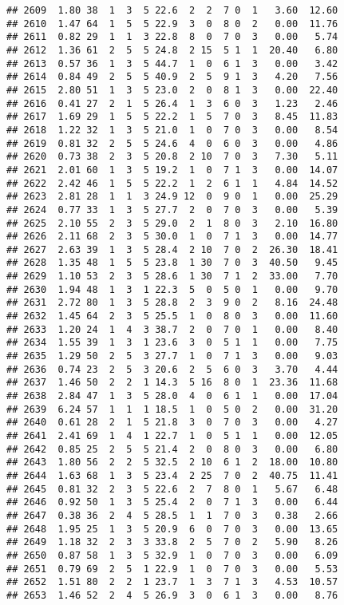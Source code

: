 \documentclass[
]{article}
\begin{document}
\begin{verbatim}
## 2609  1.80 38  1  3  5 22.6  2  2  7 0  1   3.60  12.60
## 2610  1.47 64  1  5  5 22.9  3  0  8 0  2   0.00  11.76
## 2611  0.82 29  1  1  3 22.8  8  0  7 0  3   0.00   5.74
## 2612  1.36 61  2  5  5 24.8  2 15  5 1  1  20.40   6.80
## 2613  0.57 36  1  3  5 44.7  1  0  6 1  3   0.00   3.42
## 2614  0.84 49  2  5  5 40.9  2  5  9 1  3   4.20   7.56
## 2615  2.80 51  1  3  5 23.0  2  0  8 1  3   0.00  22.40
## 2616  0.41 27  2  1  5 26.4  1  3  6 0  3   1.23   2.46
## 2617  1.69 29  1  5  5 22.2  1  5  7 0  3   8.45  11.83
## 2618  1.22 32  1  3  5 21.0  1  0  7 0  3   0.00   8.54
## 2619  0.81 32  2  5  5 24.6  4  0  6 0  3   0.00   4.86
## 2620  0.73 38  2  3  5 20.8  2 10  7 0  3   7.30   5.11
## 2621  2.01 60  1  3  5 19.2  1  0  7 1  3   0.00  14.07
## 2622  2.42 46  1  5  5 22.2  1  2  6 1  1   4.84  14.52
## 2623  2.81 28  1  1  3 24.9 12  0  9 0  1   0.00  25.29
## 2624  0.77 33  1  3  5 27.7  2  0  7 0  3   0.00   5.39
## 2625  2.10 55  2  3  5 29.0  2  1  8 0  3   2.10  16.80
## 2626  2.11 68  2  3  5 30.0  1  0  7 1  3   0.00  14.77
## 2627  2.63 39  1  3  5 28.4  2 10  7 0  2  26.30  18.41
## 2628  1.35 48  1  5  5 23.8  1 30  7 0  3  40.50   9.45
## 2629  1.10 53  2  3  5 28.6  1 30  7 1  2  33.00   7.70
## 2630  1.94 48  1  3  1 22.3  5  0  5 0  1   0.00   9.70
## 2631  2.72 80  1  3  5 28.8  2  3  9 0  2   8.16  24.48
## 2632  1.45 64  2  3  5 25.5  1  0  8 0  3   0.00  11.60
## 2633  1.20 24  1  4  3 38.7  2  0  7 0  1   0.00   8.40
## 2634  1.55 39  1  3  1 23.6  3  0  5 1  1   0.00   7.75
## 2635  1.29 50  2  5  3 27.7  1  0  7 1  3   0.00   9.03
## 2636  0.74 23  2  5  3 20.6  2  5  6 0  3   3.70   4.44
## 2637  1.46 50  2  2  1 14.3  5 16  8 0  1  23.36  11.68
## 2638  2.84 47  1  3  5 28.0  4  0  6 1  1   0.00  17.04
## 2639  6.24 57  1  1  1 18.5  1  0  5 0  2   0.00  31.20
## 2640  0.61 28  2  1  5 21.8  3  0  7 0  3   0.00   4.27
## 2641  2.41 69  1  4  1 22.7  1  0  5 1  1   0.00  12.05
## 2642  0.85 25  2  5  5 21.4  2  0  8 0  3   0.00   6.80
## 2643  1.80 56  2  2  5 32.5  2 10  6 1  2  18.00  10.80
## 2644  1.63 68  1  3  5 23.4  2 25  7 0  2  40.75  11.41
## 2645  0.81 32  2  3  5 22.6  2  7  8 0  1   5.67   6.48
## 2646  0.92 50  1  3  5 25.4  2  0  7 1  3   0.00   6.44
## 2647  0.38 36  2  4  5 28.5  1  1  7 0  3   0.38   2.66
## 2648  1.95 25  1  3  5 20.9  6  0  7 0  3   0.00  13.65
## 2649  1.18 32  2  3  3 33.8  2  5  7 0  2   5.90   8.26
## 2650  0.87 58  1  3  5 32.9  1  0  7 0  3   0.00   6.09
## 2651  0.79 69  2  5  1 22.9  1  0  7 0  3   0.00   5.53
## 2652  1.51 80  2  2  1 23.7  1  3  7 1  3   4.53  10.57
## 2653  1.46 52  2  4  5 26.9  3  0  6 1  3   0.00   8.76

\end{verbatim}
\end{document}
